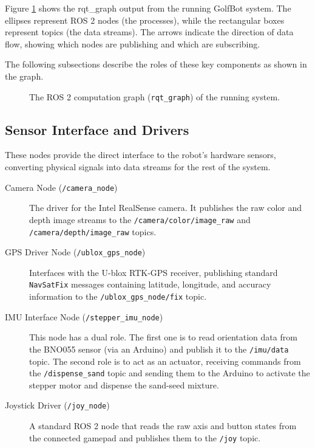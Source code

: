 Figure \ref{fig:ros2_computation_graph} shows the \gls{rqt_graph} output from the running GolfBot system. The ellipses represent ROS 2 nodes (the processes), while the rectangular boxes represent topics (the data streams). The arrows indicate the direction of data flow, showing which nodes are publishing and which are subscribing. 

The following subsections describe the roles of these key components as shown in the graph.

\begin{figure}[h!]
    \caption{The ROS 2 computation graph (\texttt{rqt\_graph}) of the running system.}
    \label{fig:ros2_computation_graph}
\end{figure}

\subsection{Sensor Interface and Drivers}
These nodes provide the direct interface to the robot's hardware sensors, converting physical signals into data streams for the rest of the system.
\begin{description}
    \item[Camera Node (\texttt{/camera\_node})] The driver for the Intel RealSense camera. It publishes the raw color and depth image streams to the \texttt{/camera/color/image\_raw} and \texttt{/camera/depth/image\_raw} topics.
    \item[GPS Driver Node (\texttt{/ublox\_gps\_node})] Interfaces with the U-blox RTK-GPS receiver, publishing standard \texttt{NavSatFix} messages containing latitude, longitude, and accuracy information to the \texttt{/ublox\_gps\_node/fix} topic.
    \item[IMU Interface Node (\texttt{/stepper\_imu\_node})] This node has a dual role. The first one is to read orientation data from the BNO055 sensor (via an Arduino) and publish it to the \texttt{/imu/data} topic. The second role is to act as an actuator, receiving commands from the \texttt{/dispense\_sand} topic and sending them to the Arduino to activate the stepper motor and dispense the sand-seed mixture.
    \item[Joystick Driver (\texttt{/joy\_node})] A standard ROS 2 node that reads the raw axis and button states from the connected gamepad and publishes them to the \texttt{/joy} topic.
\end{description}


